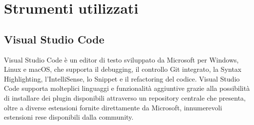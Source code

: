 \section{Strumenti utilizzati}
\subsection{Visual Studio Code}
Visual Studio Code è un editor di testo sviluppato da Microsoft per Windows, Linux e macOS, che supporta il debugging, il controllo Git integrato, la Syntax Highlighting, l'IntelliSense, lo Snippet e il refactoring del codice. 
Visual Studio Code supporta molteplici linguaggi e funzionalità aggiuntive grazie alla possibilità di installare dei plugin disponibili attraverso un repository centrale che presenta, oltre a diverse estensioni fornite direttamente da Microsoft, innumerevoli estensioni rese disponibili dalla community. 

